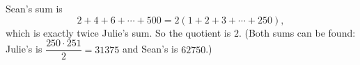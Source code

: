 Sean's sum is
\[
2+4+6+\cdots+500=2(1+2+3+\cdots+250),
\]
which is exactly twice Julie's sum. So the quotient is $\boxed{2}$. (Both sums can be found: Julie's is $\dfrac{250\cdot251}{2}=31375$ and Sean's is $62750$.)
